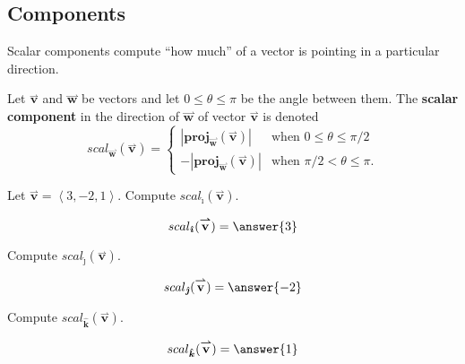 \documentclass{ximera}
\begin{document}
\subsection{Components}
Scalar components compute ``how much'' of a vector is pointing in a
particular direction.
\begin{definition}
  Let $\overset{\boldsymbol{\rightharpoonup}}{\mathbf{v}}$ and $\overset{\boldsymbol{\rightharpoonup}}{\mathbf{w}}$ be vectors and let $0\le\theta\le\pi$ be
  the angle between them.  The \textbf{scalar component}
  in the direction of $\overset{\boldsymbol{\rightharpoonup}}{\mathbf{w}}$ of vector $\overset{\boldsymbol{\rightharpoonup}}{\mathbf{v}}$ is denoted
  \[
  scal_{\overset{\boldsymbol{\rightharpoonup}}{\mathbf{w}}}(\overset{\boldsymbol{\rightharpoonup}}{\mathbf{v}})=
  \begin{cases}
    |\mathbf{proj}_{\overset{\boldsymbol{\rightharpoonup}}{\mathbf{w}}}(\overset{\boldsymbol{\rightharpoonup}}{\mathbf{v}})| &\text{when $0\le\theta\le \pi/2$}\\
    -|\mathbf{proj}_{\overset{\boldsymbol{\rightharpoonup}}{\mathbf{w}}}(\overset{\boldsymbol{\rightharpoonup}}{\mathbf{v}})| &\text{when $\pi/2<\theta\le \pi$.}
  \end{cases}
  \]
\end{definition}



\begin{question}
  Let $\overset{\boldsymbol{\rightharpoonup}}{\mathbf{v}} = \left< 3,-2,1 \right>$. Compute $scal_{\boldsymbol{\hat{\imath}}}(\overset{\boldsymbol{\rightharpoonup}}{\mathbf{v}})$.
  \begin{prompt}
    \[
    scal_{\boldsymbol{\hat{\imath}}}(\overset{\boldsymbol{\rightharpoonup}}{\mathbf{v}}) = \answer{3}
    \]
  \end{prompt}
  \begin{question}
    Compute $scal_{\boldsymbol{\hat{\jmath}}}(\overset{\boldsymbol{\rightharpoonup}}{\mathbf{v}})$.
    \begin{prompt}
      \[
      scal_{\boldsymbol{\hat{\jmath}}}(\overset{\boldsymbol{\rightharpoonup}}{\mathbf{v}}) = \answer{-2}
      \]
    \end{prompt}
    \begin{question}
      Compute $scal_{\boldsymbol{\hat{k}}}(\overset{\boldsymbol{\rightharpoonup}}{\mathbf{v}})$.
      \begin{prompt}
        \[
        scal_{\boldsymbol{\hat{k}}}(\overset{\boldsymbol{\rightharpoonup}}{\mathbf{v}}) = \answer{1}
        \]
      \end{prompt}
    \end{question}
  \end{question}
\end{question}
\end{document}
